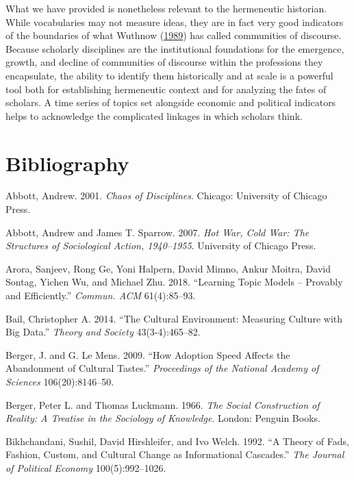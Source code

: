 \documentclass[]{book}
\theoremstyle{definition}
\theoremstyle{definition}
\theoremstyle{definition}
\theoremstyle{remark}
\begin{document}
What we have provided is nonetheless relevant to the hermeneutic
historian. While vocabularies may not measure ideas, they are in fact
very good indicators of the boundaries of what Wuthnow
(\protect\hyperlink{ref-Wuthnow1989Communities}{1989}) has called
communities of discourse. Because scholarly disciplines are the
institutional foundations for the emergence, growth, and decline of
communities of discourse within the professions they encapsulate, the
ability to identify them historically and at scale is a powerful tool
both for establishing hermeneutic context and for analyzing the fates of
scholars. A time series of topics set alongside economic and political
indicators helps to acknowledge the complicated linkages in which
scholars think.

\hypertarget{bibliography}{%
\chapter*{Bibliography}\label{bibliography}}


\hypertarget{refs}{}
\leavevmode\hypertarget{ref-Abbott2001Chaos}{}%
Abbott, Andrew. 2001. \emph{Chaos of Disciplines}. Chicago: University
of Chicago Press.

\leavevmode\hypertarget{ref-Abbott2007Hot}{}%
Abbott, Andrew and James T. Sparrow. 2007. \emph{Hot War, Cold War: The
Structures of Sociological Action, 1940--1955}. University of Chicago
Press.

\leavevmode\hypertarget{ref-Arora2018Learning}{}%
Arora, Sanjeev, Rong Ge, Yoni Halpern, David Mimno, Ankur Moitra, David
Sontag, Yichen Wu, and Michael Zhu. 2018. ``Learning Topic Models --
Provably and Efficiently.'' \emph{Commun. ACM} 61(4):85--93.

\leavevmode\hypertarget{ref-Bail2014cultural}{}%
Bail, Christopher A. 2014. ``The Cultural Environment: Measuring Culture
with Big Data.'' \emph{Theory and Society} 43(3-4):465--82.

\leavevmode\hypertarget{ref-Berger2009How}{}%
Berger, J. and G. Le Mens. 2009. ``How Adoption Speed Affects the
Abandonment of Cultural Tastes.'' \emph{Proceedings of the National
Academy of Sciences} 106(20):8146--50.

\leavevmode\hypertarget{ref-Berger1966Social}{}%
Berger, Peter L. and Thomas Luckmann. 1966. \emph{The Social
Construction of Reality: A Treatise in the Sociology of Knowledge}.
London: Penguin Books.

\leavevmode\hypertarget{ref-Bikhchandani1992Theory}{}%
Bikhchandani, Sushil, David Hirshleifer, and Ivo Welch. 1992. ``A Theory
of Fads, Fashion, Custom, and Cultural Change as Informational
Cascades.'' \emph{The Journal of Political Economy} 100(5):992--1026.
\end{document}
